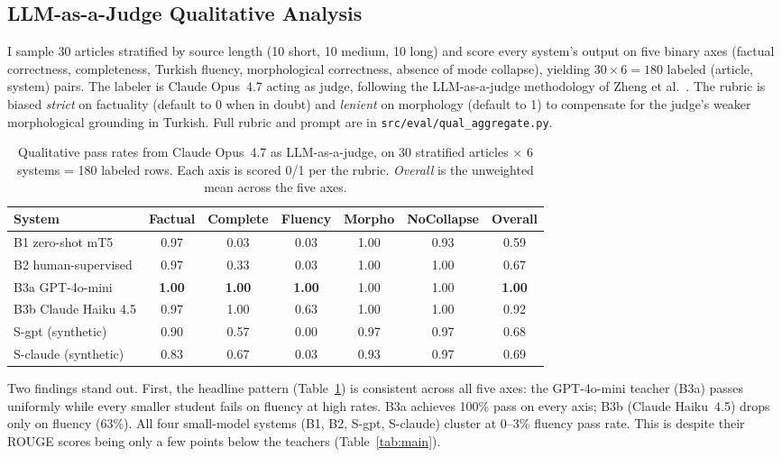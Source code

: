 \documentclass{llncs}
\begin{document}
\subsection{LLM-as-a-Judge Qualitative Analysis}

I sample 30 articles stratified by source length (10 short, 10 medium, 10 long) and score every system's output on five binary axes (factual correctness, completeness, Turkish fluency, morphological correctness, absence of mode collapse), yielding $30 \times 6 = 180$ labeled (article, system) pairs. The labeler is Claude Opus~4.7 acting as judge, following the LLM-as-a-judge methodology of Zheng et al.~\cite{zheng2023judging}. The rubric is biased \emph{strict} on factuality (default to 0 when in doubt) and \emph{lenient} on morphology (default to 1) to compensate for the judge's weaker morphological grounding in Turkish. Full rubric and prompt are in \texttt{src/eval/qual\_aggregate.py}.

\begin{table}[!ht]
\centering
\caption{Qualitative pass rates from Claude Opus~4.7 as LLM-as-a-judge, on 30 stratified articles $\times$ 6 systems = 180 labeled rows. Each axis is scored 0/1 per the rubric. \emph{Overall} is the unweighted mean across the five axes.}
\label{tab:qual}
\small
\begin{tabular}{lcccccc}
\toprule
System & Factual & Complete & Fluency & Morpho & NoCollapse & Overall \\
\midrule
B1 zero-shot mT5    & 0.97 & 0.03 & 0.03 & 1.00 & 0.93 & 0.59 \\
B2 human-supervised & 0.97 & 0.33 & 0.03 & 1.00 & 1.00 & 0.67 \\
B3a GPT-4o-mini     & \textbf{1.00} & \textbf{1.00} & \textbf{1.00} & 1.00 & 1.00 & \textbf{1.00} \\
B3b Claude Haiku 4.5 & 0.97 & 1.00 & 0.63 & 1.00 & 1.00 & 0.92 \\
S-gpt (synthetic)   & 0.90 & 0.57 & 0.00 & 0.97 & 0.97 & 0.68 \\
S-claude (synthetic) & 0.83 & 0.67 & 0.03 & 0.93 & 0.97 & 0.69 \\
\bottomrule
\end{tabular}
\end{table}

Two findings stand out. First, the headline pattern (Table~\ref{tab:qual}) is consistent across all five axes: the GPT-4o-mini teacher (B3a) passes uniformly while every smaller student fails on fluency at high rates. B3a achieves 100\% pass on every axis; B3b (Claude Haiku~4.5) drops only on fluency (63\%). All four small-model systems (B1, B2, S-gpt, S-claude) cluster at 0--3\% fluency pass rate. This is despite their ROUGE scores being only a few points below the teachers (Table~\ref{tab:main}).
\end{document}
